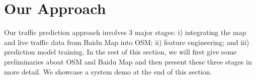 \section{Our Approach}
\label{sec:approach}

Our traffic prediction approach involves 3 major stages: i) integrating
the map and live traffic data from Baidu Map into OSM; ii) feature engineering;
and iii) prediction model training. In the rest of this section, we will first
give some preliminaries about OSM and Baidu Map and then present these three
stages in more detail. We showcase a system demo at the end of this section.










